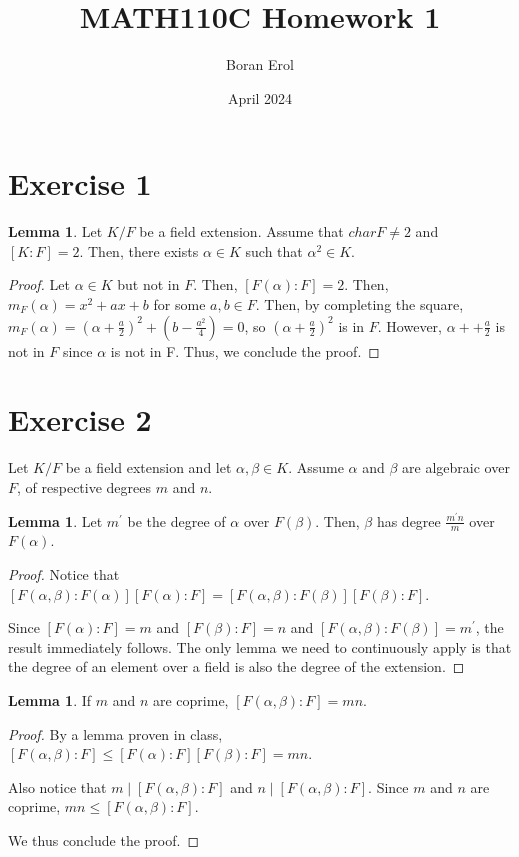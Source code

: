 \documentclass{article}
\title{MATH110C Homework 1}
\date{April 2024}
\author{Boran Erol}
\theoremstyle{definition}
\newtheorem{lemma}[theorem]{Lemma}
\begin{document}
\maketitle

\section{Exercise 1}

\begin{lemma}
    Let $K/F$ be a field extension. Assume that $char{F} \neq 2$ and $[K : F] = 2$.
    Then, there exists $\alpha \in K$ such that $\alpha^{2} \in K$.
\end{lemma}
\begin{proof}
    Let $\alpha \in K$ but not in $F$. Then, $[F(\alpha):F] = 2$. Then, $m_{F}(\alpha) = x^{2} + ax + b$
    for some $a,b \in F$. Then, by completing the square, $m_{F}(\alpha) = (\alpha + \frac{a}{2})^{2} + (b - \frac{a^{2}}{4}) = 0$,
    so $(\alpha + \frac{a}{2})^{2}$ is in $F$. However, $\alpha + + \frac{a}{2}$ is not in $F$ since $\alpha$ is not in F. Thus, we
    conclude the proof.
\end{proof}

\newpage

\section{Exercise 2}

Let $K/F$ be a field extension and let $\alpha, \beta \in K$. Assume $\alpha$ and $\beta$
are algebraic over $F$, of respective degrees $m$ and $n$.

\begin{lemma}
    Let $m^{\prime}$ be the degree of $\alpha$ over $F(\beta)$. Then, $\beta$ has degree
    $\frac{m^{\prime}n}{m}$ over $F(\alpha)$.
\end{lemma}
\begin{proof}
    Notice that $[F(\alpha, \beta): F(\alpha)][F(\alpha): F] = [F(\alpha, \beta): F(\beta)][F(\beta): F]$.

    Since $[F(\alpha): F] = m$ and $[F(\beta): F] = n$ and $[F(\alpha, \beta): F(\beta)] = m^{\prime}$, the result
    immediately follows. The only lemma we need to continuously apply is that the degree of an element over a field
    is also the degree of the extension.
\end{proof}

\begin{lemma}
    If $m$ and $n$ are coprime, $[F(\alpha, \beta): F] = mn$.
\end{lemma}
\begin{proof}
    By a lemma proven in class, $[F(\alpha, \beta): F] \leq [F(\alpha): F][F(\beta): F] = mn$.

    Also notice that $m \mid [F(\alpha, \beta): F]$ and $n \mid [F(\alpha, \beta): F]$.
    Since $m$ and $n$ are coprime, $mn \leq [F(\alpha, \beta): F]$.

    We thus conclude the proof.
\end{proof}
\end{document}
